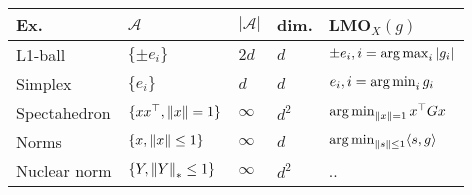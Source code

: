 \documentclass{standalone}
\begin{document}
\begin{tabular}{l|l|l|l|l} 
    Ex. & $\mathcal{A}$ & $|\mathcal{A}|$ & dim. & LMO$_X (g)$ \\
    \hline
    L1-ball & $\{\pm e_i \}$ & $2d$ & $d$ & $\pm e_i, i = \operatorname*{arg\,max}_i |g_i|$ \\
    Simplex & $\{e_i\}$ & $d$ & $d$ & $e_i, i = \operatorname*{arg\,min}_i g_i$ \\
    Spectahedron & $\{ xx^\top, \left\lVert x \right\rVert = 1\}$ & $\infty$ & $d^2$ & $\operatorname*{arg\,min}_{\left\lVert x \right\rVert = 1} x^\top G x$ \\
    Norms & $\{ x, \left\lVert x \right\rVert \leq 1\}$ & $\infty$ & $d$ & $\operatorname*{arg\,min}_{\left\lVert s \right\rVert \leq 1} \langle s, g \rangle$ \\
    Nuclear norm & $\{Y, \left\lVert Y \right\rVert_* \leq 1\}$ & $\infty$ & $d^2$ & .. \\
\end{tabular}
\end{document}
